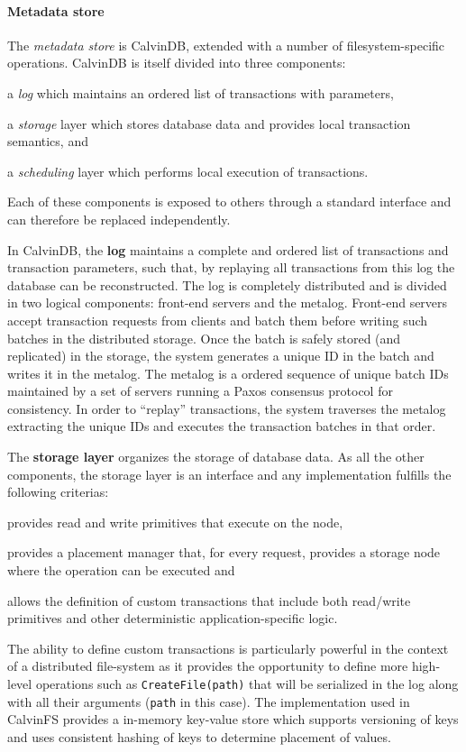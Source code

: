 \paragraph{Metadata store} The \emph{metadata store} is CalvinDB, extended with a number of filesystem-specific operations.
CalvinDB is itself divided into three components: \begin{inparaenum}[i)]
    \item a \emph{log} which maintains an ordered list of transactions with parameters,
    \item a \emph{storage} layer which stores database data and provides local transaction semantics, and
    \item a \emph{scheduling} layer which performs local execution of transactions.
\end{inparaenum}
Each of these components is exposed to others through a standard interface and can therefore be replaced independently.

In CalvinDB, the \textbf{log} maintains a complete and ordered list of transactions and transaction parameters, such that, by replaying all transactions from this log the database can be reconstructed.
The log is completely distributed and is divided in two logical components: front-end servers and the metalog.
Front-end servers accept transaction requests from clients and batch them before writing such batches in the distributed storage.
Once the batch is safely stored (and replicated) in the storage, the system generates a unique ID in the batch and writes it in the metalog.
The metalog is a ordered sequence of unique batch IDs maintained by a set of servers running a Paxos consensus protocol for consistency.
In order to ``replay'' transactions, the system traverses the metalog extracting the unique IDs and executes the transaction batches in that order.

The \textbf{storage layer} organizes the storage of database data.
As all the other components, the storage layer is an interface and any implementation fulfills the following criterias: 
\begin{inparaenum}[i)]
    \item provides read and write primitives that execute on the node,
    \item provides a placement manager that, for every request, provides a storage node where the operation can be executed and
    \item allows the definition of custom transactions that include both read/write primitives and other deterministic application-specific logic.
\end{inparaenum}
The ability to define custom transactions is particularly powerful in the context of a distributed file-system as it provides the opportunity to define more high-level operations such as \texttt{CreateFile(path)} that will be serialized in the log along with all their arguments (\texttt{path} in this case).
The implementation used in CalvinFS provides a in-memory key-value store which supports versioning of keys and uses consistent hashing of keys to determine placement of values.

